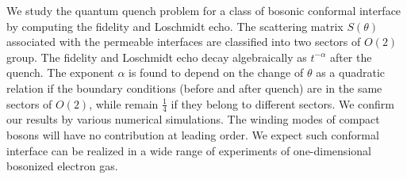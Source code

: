 We study the quantum quench problem for a class of bosonic conformal interface by computing the fidelity and Loschmidt echo. The scattering matrix $S(\theta)$ associated with the permeable interfaces are classified into two sectors of $O(2)$ group. The fidelity and Loschmidt echo decay algebraically as $t^{-\alpha}$ after the quench. The exponent $\alpha$ is found to depend on the change of $\theta$ as a quadratic relation if the boundary conditions (before and after quench) are in the same sectors of $O(2)$, while remain $\frac{1}{4}$ if they belong to different sectors. We confirm our results by various numerical simulations. The winding modes of compact bosons will have no contribution at leading order. We expect such conformal interface can be realized in a wide range of experiments of one-dimensional bosonized electron gas.


